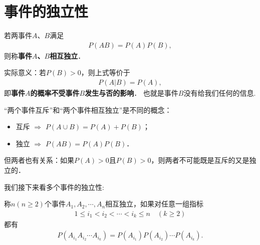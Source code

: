 \section{事件的独立性}

\begin{definition}
    若两事件$A$、$B$满足
    \begin{align*}
        P(AB)= P(A) P(B),
    \end{align*}
    则称\textbf{事件$A$、$B$相互独立}．%
\end{definition}

实际意义：若$P(B)>0$，则上式等价于
    \begin{align*}
        P(A|B)= P(A),
    \end{align*}
    即\textbf{事件$A$的概率不受事件$B$发生与否的影响}． 也就是事件$B$没有给我们任何的信息. 

\begin{remark}
    “两个事件互斥”和“两个事件相互独立”是不同的概念：
    \begin{itemize}
        \item 互斥 $\Rightarrow$ $P(A\cup B)=P(A)+P(B)$；
        \item 独立 $\Rightarrow$ $P(AB)=P(A)P(B)$．
    \end{itemize}
    但两者也有关系：如果$P(A)>0$且$P(B)>0$，则两者不可能既是互斥的又是独立的．
\end{remark}

我们接下来看多个事件的独立性: 

\begin{definition}
    称$n(n\ge 2)$个事件$A_1, A_2, \cdots, A_n$相互独立，如果对任意一组指标
    \begin{align*}
        1\le i_1<i_2< \cdots <i_k\le n\quad (k\ge 2)
    \end{align*}
    都有
    \begin{align*}
        P(A_{i_1}A_{i_2}\cdots A_{i_k})=P(A_{i_1})P(A_{i_2})\cdots  P(A_{i_k}).
    \end{align*}
\end{definition}

